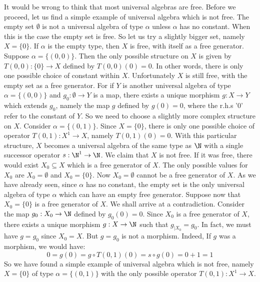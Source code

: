 It would be wrong to think that most universal algebras are free. Before we
proceed, let us find a simple example of universal algebra which is not free. The
empty set $\emptyset$ is not a universal algebra of type $\alpha$ unless $\alpha$
has no constant. When this is the case the empty set is free. So let us try a
slightly bigger set, namely $X = \{0\}$. If $\alpha$ is the empty type, then $X$
is free, with itself as a free generator. Suppose $\alpha =\{(0,0)\}$. Then the
only possible structure on $X$ is given by $T(0,0):\{0\}\to X$ defined by
$T(0,0)(0)=0$. In other words, there is only one possible choice of constant
within $X$. Unfortunately $X$ is still free, with the empty set as a free
generator. For if $Y$ is another universal algebra of type $\alpha=\{(0,0)\}$ and
$g_{0}:\emptyset\to Y$ is a map, there exists a unique morphism $g:X\to Y$ which
extends $g_{0}$, namely the map $g$ defined by $g(0)=0$, where the r.h.s '$0$'
refer to the constant of $Y$. So we need to choose a slightly more complex
structure on $X$. Consider $\alpha=\{(0,1)\}$. Since $X=\{0\}$, there is only one
possible choice of operator $T(0,1):X^{1}\to X$, namely $T(0,1)(0)=0$. With this
particular structure, $X$ becomes a universal algebra of the same type as $\N$
with a single successor operator $s:\N^{1}\to \N$. We claim that $X$ is not free.
If it was free, there would exist $X_{0}\subseteq X$ which is a free generator of
$X$. The only possible values for $X_{0}$ are $X_{0}=\emptyset$ and $X_{0}=\{0\}$.
Now $X_{0}=\emptyset$ cannot be a free generator of $X$. As we have already seen,
since $\alpha$ has no constant, the empty set is the only universal algebra of
type $\alpha$ which can have an empty free generator. Suppose now that
$X_{0}=\{0\}$ is a free generator of $X$. We shall arrive at a contradiction.
Consider the map $g_{0}:X_{0}\to\N$ defined by $g_{0}(0)=0$. Since $X_{0}$ is a free
generator of $X$, there exists a unique morphism $g:X\to\N$ such that
$g_{|X_{0}}=g_{0}$. In fact, we must have $g=g_{0}$ since $X_{0}=X$. But $g=g_{0}$
is not a morphism. Indeed, If $g$ was a morphism, we would have:
    \[
    0=g(0) = g\circ T(0,1)(0) = s\circ g(0)= 0 + 1 = 1
    \]
So we have found a simple example of universal algebra which is not free, namely
$X=\{0\}$ of type $\alpha=\{(0,1)\}$ with the only possible operator
$T(0,1):X^{1}\to X$.


